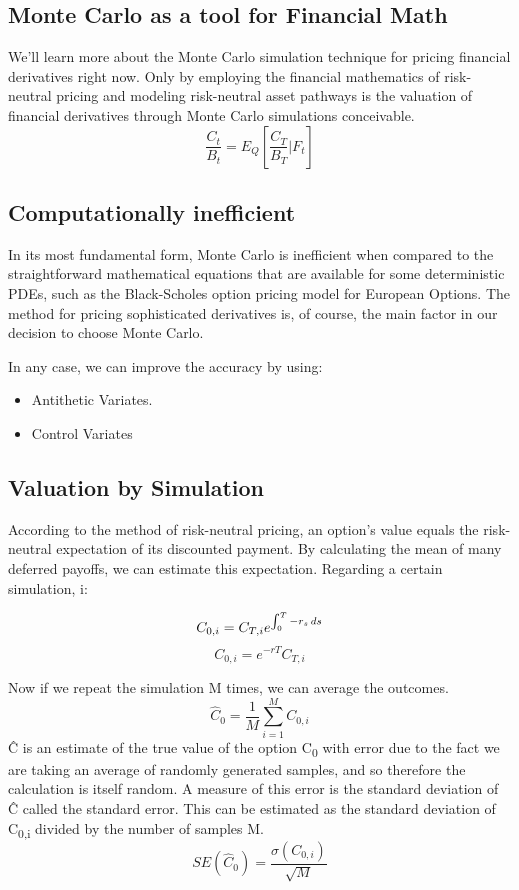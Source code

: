 \subsection{Monte Carlo as a tool for Financial Math}
\noindent We'll learn more about the Monte Carlo simulation technique for pricing financial derivatives right now. Only by employing the financial mathematics of risk-neutral pricing and modeling risk-neutral asset pathways is the valuation of financial derivatives through Monte Carlo simulations conceivable.\\
\begin{equation}
	\frac{C_{t}}{B_{t}}= E_{Q}[\frac{C_{T}}{B_{T}}|F_{t}]
\end{equation}
\subsection{Computationally inefficient}
\noindent In its most fundamental form, Monte Carlo is inefficient when compared to the straightforward mathematical equations that are available for some deterministic PDEs, such as the Black-Scholes option pricing model for European Options. The method for pricing sophisticated derivatives is, of course, the main factor in our decision to choose Monte Carlo.

In any case, we can improve the accuracy by using:
\begin{itemize}
	\item Antithetic Variates.\\[-4mm]
	\item Control Variates
\end{itemize}
\subsection{Valuation by Simulation}
\noindent According to the method of risk-neutral pricing, an option's value equals the risk-neutral expectation of its discounted payment.
By calculating the mean of many deferred payoffs, we can estimate this expectation. Regarding a certain simulation, i:

\begin{equation}
	C_{0,i}= C_{T,i}e^{\int_{0}^{T}-r_{s}\,ds}\\
\end{equation}
\begin{equation}
	C_{0,i}=e^{-rT}C_{T,i}
\end{equation}

\noindent Now if we repeat the simulation M times, we can average the outcomes.\\
\begin{equation}
	\hat{C}_{0}=\frac{1}{M} \sum_{i=1}^{M} C_{0,i}
\end{equation}
\noindent \^{C} is an estimate of the true value of the option 
C\textsubscript{0} with error due to the fact we are taking an average of randomly generated samples, and so therefore the calculation is itself random. A measure of this error is the standard deviation of 
\^{C} called the standard error. This can be estimated as the standard deviation of C\textsubscript{0,i} divided by the number of samples M.
$$SE(\hat{C}_{0})=\frac{\sigma(C_{0,i})}{\sqrt{M}}$$ 

